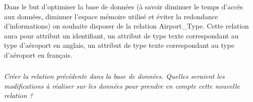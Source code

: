 \documentclass[10pt]{article}
\newif\ifprof
\begin{document}
\ifprof
\begin{corrige}
\begin{itemize}
\item  Countries :
\begin{itemize}
\item id;
\item code;
\item name;
\item continent;
\item wikipedia\_link;
\item keywords.
\end{itemize}
\item Regions :
\begin{itemize}
\item id;
\item code;
\item local\_code;
\item name;
\item continent;	
\item iso\_country;
\item wikipedia\_link;
\item keywords.
\end{itemize}
\item Regions :
\begin{itemize}
\item id;
\item code;
\item local\_code;
\item name;
\item continent;	
\item iso\_country;
\item wikipedia\_link;
\item keywords.
\end{itemize}
\end{itemize}
\end{corrige}
\else

Dans le but d'optimiser la base de données (à savoir diminuer le temps d'accès aux données, diminuer l'espace mémoire utilisé et éviter la redondance d'informations) on souhaite disposer de la relation \textsf{Airport\_Type}. Cette relation aura pour attribut un identifiant, un attribut de type texte correspondant au type d'aéroport en anglais, un attribut de type texte correspondant au type d'aéroport en français. 

\fi


\subparagraph{}
\textit{Créer la relation précédente dans la base de données. Quelles seraient les modifications à réaliser sur les données pour prendre en compte cette nouvelle relation ?}
\end{document}
